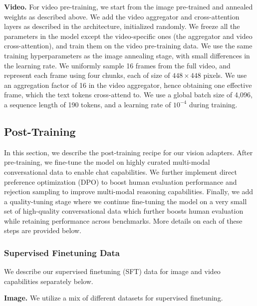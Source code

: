 \textbf{Video.}
For video pre-training, we start from the image pre-trained and annealed weights as described above. We add the video aggregator and cross-attention layers as described in the architecture, initialized randomly. We freeze all the parameters in the model except the video-specific ones (the aggregator and video cross-attention), and train them on the video pre-training data. We use the same training hyperparameters as the image annealing stage, with small differences in the learning rate. We uniformly sample 16 frames from the full video, and represent each frame using four chunks, each of size of $448 \times 448$ pixels. We use an aggregation factor of 16 in the video aggregator, hence obtaining one effective frame, which the text tokens cross-attend to. We use a global batch size of 4,096, a sequence length of 190 tokens, and a learning rate of $10^{-4}$ during training.

\subsection{Post-Training}
\label{section:vision_post_training}
In this section, we describe the post-training recipe for our vision adapters. After pre-training, we fine-tune the model on highly curated multi-modal conversational data to enable chat capabilities. We further implement direct preference optimization (DPO) to boost human evaluation performance and rejection sampling to improve multi-modal reasoning capabilities. Finally, we add a quality-tuning stage where we continue fine-tuning the model on a very small set of high-quality conversational data which further boosts human evaluation while retaining performance across benchmarks. More details on each of these steps are provided below.

\subsubsection{Supervised Finetuning Data}
\label{subsubsection:vision_supervised_finetuning_data}
We describe our supervised finetuning (SFT) data for image and video capabilities separately below.

\textbf{Image.} We utilize a mix of different datasets for supervised finetuning.

